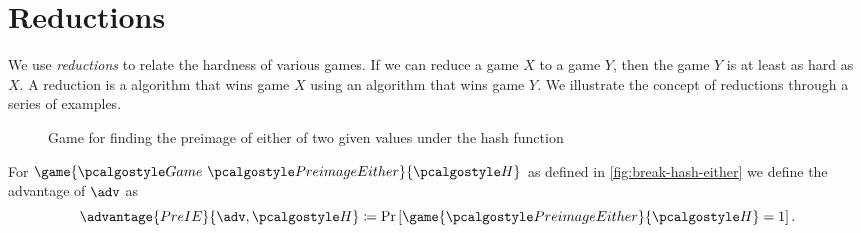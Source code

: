 \section{Reductions}
We use \emph{reductions} to relate the hardness of various games.
If we can reduce a game $X$ to a game $Y$, then the game $Y$ is at least as hard as $X$.
A reduction is a \ppt algorithm that wins game $X$ using an algorithm that wins game $Y$.
We illustrate the concept of reductions through a series of examples.

\begin{figure}[tbhp]
  \begin{center}
    \begin{tcolorbox}[width=7cm]
      \begin{pchstack}[center]
      \end{pchstack}
    \end{tcolorbox}
  \end{center}
  \caption{Game for finding the preimage of either of two given values under the hash function \label{fig:break-hash-either}}
\end{figure}


\begin{definition}
  For $\game{\Game~\algo{PreimageEither}}{\algo{H}}$ as defined in \autoref{fig:break-hash-either} we define the advantage of $\adv$ as
 \[
  \advantage{PreIE}{\adv, \algo{H}} \defeq \pr{\game{\algo{PreimageEither}}{\algo{H}} = 1}.
 \]
\end{definition}

